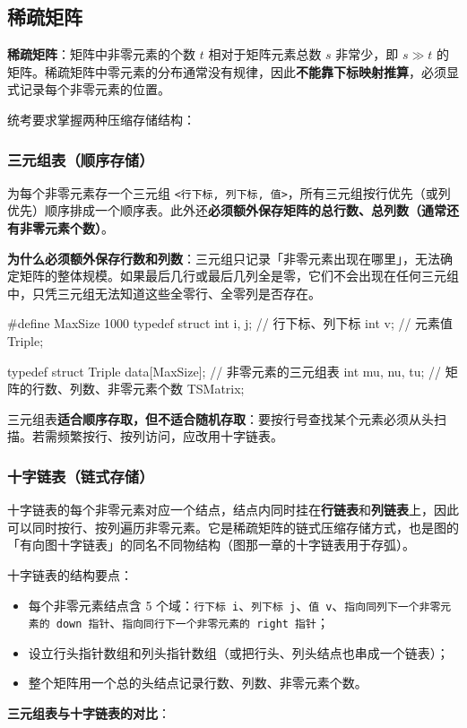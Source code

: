 \documentclass[11pt,openany,UTF8]{ctexbook}
\begin{document}
\subsection{稀疏矩阵}

\textbf{稀疏矩阵}：矩阵中非零元素的个数 $t$ 相对于矩阵元素总数 $s$ 非常少，即 $s \gg t$ 的矩阵。稀疏矩阵中零元素的分布通常没有规律，因此\textbf{不能靠下标映射推算}，必须显式记录每个非零元素的位置。

统考要求掌握两种压缩存储结构：

\subsubsection{三元组表（顺序存储）}

为每个非零元素存一个三元组 \texttt{<\allowbreak{}行下标,\allowbreak{} 列下标,\allowbreak{} 值>\allowbreak{}}，所有三元组按行优先（或列优先）顺序排成一个顺序表。此外还\textbf{必须额外保存矩阵的总行数、总列数（通常还有非零元素个数）}。

\textbf{为什么必须额外保存行数和列数}：三元组只记录「非零元素出现在哪里」，无法确定矩阵的整体规模。如果最后几行或最后几列全是零，它们不会出现在任何三元组中，只凭三元组无法知道这些全零行、全零列是否存在。

\begin{codebox}
#define MaxSize 1000
typedef struct {
    int i, j;        // 行下标、列下标
    int v;           // 元素值
} Triple;

typedef struct {
    Triple data[MaxSize];   // 非零元素的三元组表
    int mu, nu, tu;         // 矩阵的行数、列数、非零元素个数
} TSMatrix;
\end{codebox}

三元组表\textbf{适合顺序存取，但不适合随机存取}：要按行号查找某个元素必须从头扫描。若需频繁按行、按列访问，应改用十字链表。

\subsubsection{十字链表（链式存储）}

十字链表的每个非零元素对应一个结点，结点内同时挂在\textbf{行链表}和\textbf{列链表}上，因此可以同时按行、按列遍历非零元素。它是稀疏矩阵的链式压缩存储方式，也是图的「有向图十字链表」的同名不同物结构（图那一章的十字链表用于存弧）。

十字链表的结构要点：

\begin{itemize}
\item 每个非零元素结点含 5 个域：\texttt{行下标 i}、\texttt{列下标 j}、\texttt{值 v}、\texttt{指向同列下一个非零元素的 down 指针}、\texttt{指向同行下一个非零元素的 right 指针}；
\item 设立行头指针数组和列头指针数组（或把行头、列头结点也串成一个链表）；
\item 整个矩阵用一个总的头结点记录行数、列数、非零元素个数。
\end{itemize}
\textbf{三元组表与十字链表的对比}：
\end{document}
